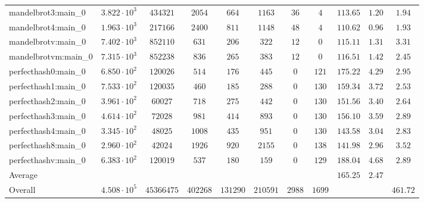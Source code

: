 \begin{tabular}{|l|c|c|c|c|c|c|c|c|c|c|}
mandelbrot3:main\_0            & $ 3.822 \cdot 10^{3} $ & $ 434321   $ & $ 2054   $ & $ 664    $ & $ 1163   $ & $ 36   $ & $ 4    $ & $ 113.65      $ & $ 1.20    $ & $ 1.94    $ \\
mandelbrot4:main\_0            & $ 1.963 \cdot 10^{3} $ & $ 217166   $ & $ 2400   $ & $ 811    $ & $ 1148   $ & $ 48   $ & $ 4    $ & $ 110.62      $ & $ 0.96    $ & $ 1.93    $ \\
mandelbrotv:main\_0            & $ 7.402 \cdot 10^{3} $ & $ 852110   $ & $ 631    $ & $ 206    $ & $ 322    $ & $ 12   $ & $ 0    $ & $ 115.11      $ & $ 1.31    $ & $ 3.31    $ \\
mandelbrotvm:main\_0           & $ 7.315 \cdot 10^{3} $ & $ 852238   $ & $ 836    $ & $ 265    $ & $ 383    $ & $ 12   $ & $ 0    $ & $ 116.51      $ & $ 1.42    $ & $ 2.45    $ \\
perfecthash0:main\_0           & $ 6.850 \cdot 10^{2} $ & $ 120026   $ & $ 514    $ & $ 176    $ & $ 445    $ & $ 0    $ & $ 121  $ & $ 175.22      $ & $ 4.29    $ & $ 2.95    $ \\
perfecthash1:main\_0           & $ 7.533 \cdot 10^{2} $ & $ 120035   $ & $ 460    $ & $ 185    $ & $ 288    $ & $ 0    $ & $ 130  $ & $ 159.34      $ & $ 3.72    $ & $ 2.53    $ \\
perfecthash2:main\_0           & $ 3.961 \cdot 10^{2} $ & $ 60027    $ & $ 718    $ & $ 275    $ & $ 442    $ & $ 0    $ & $ 130  $ & $ 151.56      $ & $ 3.40    $ & $ 2.64    $ \\
perfecthash3:main\_0           & $ 4.614 \cdot 10^{2} $ & $ 72028    $ & $ 981    $ & $ 414    $ & $ 893    $ & $ 0    $ & $ 130  $ & $ 156.10      $ & $ 3.59    $ & $ 2.89    $ \\
perfecthash4:main\_0           & $ 3.345 \cdot 10^{2} $ & $ 48025    $ & $ 1008   $ & $ 435    $ & $ 951    $ & $ 0    $ & $ 130  $ & $ 143.58      $ & $ 3.04    $ & $ 2.83    $ \\
perfecthash8:main\_0           & $ 2.960 \cdot 10^{2} $ & $ 42024    $ & $ 1926   $ & $ 920    $ & $ 2155   $ & $ 0    $ & $ 138  $ & $ 141.98      $ & $ 2.96    $ & $ 3.52    $ \\
perfecthashv:main\_0           & $ 6.383 \cdot 10^{2} $ & $ 120019   $ & $ 537    $ & $ 180    $ & $ 159    $ & $ 0    $ & $ 129  $ & $ 188.04      $ & $ 4.68    $ & $ 2.89    $ \\
\hline
Average                        & $                    $ & $          $ & $        $ & $        $ & $        $ & $      $ & $      $ & $ 165.25      $ & $ 2.47    $ & $         $ \\
\hline
Overall                        & $ 4.508 \cdot 10^{5} $ & $ 45366475 $ & $ 402268 $ & $ 131290 $ & $ 210591 $ & $ 2988 $ & $ 1699 $ & $             $ & $         $ & $ 461.72  $ \\
\hline
\end{tabular}
